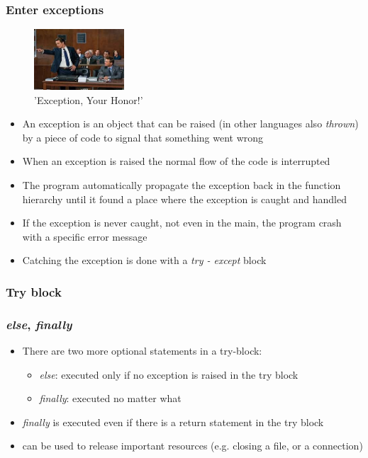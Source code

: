 \documentclass[9pt]{beamer}
\begin{document}
\begin{frame}
  \frametitle{Enter exceptions}
  \begin{figure}
    \includegraphics[width=0.3\textwidth]{avvocato.jpeg}
    \caption{\footnotesize'Exception, Your Honor!'}
  \end{figure}
  \small
  \begin{itemize}
    \item An exception is an object that can be \alert{raised} (in other languages also \textit{thrown}) by
          a piece of code to signal that something went wrong
    \item When an exception is raised the normal flow of the code is interrupted
    \item The program automatically propagate the exception back in the function hierarchy
          until it found a place where the exception is  \alert{caught} and handled
    \item If the exception is never caught, not even in the main, the program crash \alert{with a specific error message}
    \item Catching the exception is done with a \emph{try - except} block
  \end{itemize}
\end{frame}


\begin{frame}
  \frametitle{Try block}
  
\end{frame}


\begin{frame}
  \frametitle{\emph{else}, \emph{finally}}
  \begin{itemize}
    \item There are two more optional statements in a try-block:
    \medskip
    \begin{itemize}
      \item \emph{else}: executed only if no exception is raised in the try block
      \medskip
      \item \emph{finally}: executed no matter what
      \medskip
    \end{itemize}
    \item \emph{finally} is executed even if there is a return statement in the try
          block
    \item can be used to release important resources (e.g. closing a
          file, or a connection)
  \end{itemize}
\end{frame}
\end{document}
